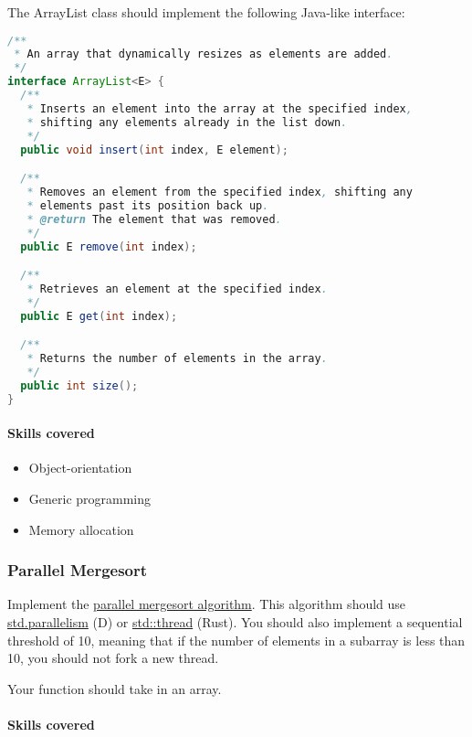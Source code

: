 The ArrayList class should implement the following Java-like interface:

\begin{lstlisting}[language=Java]
/**
 * An array that dynamically resizes as elements are added.
 */
interface ArrayList<E> {
  /**
   * Inserts an element into the array at the specified index,
   * shifting any elements already in the list down.
   */
  public void insert(int index, E element);

  /**
   * Removes an element from the specified index, shifting any
   * elements past its position back up.
   * @return The element that was removed.
   */
  public E remove(int index);

  /**
   * Retrieves an element at the specified index.
   */
  public E get(int index);

  /**
   * Returns the number of elements in the array.
   */
  public int size();
}
\end{lstlisting}

\paragraph{Skills covered}\label{skills-covered-2}

\begin{itemize}
\itemsep1pt\parskip0pt
\item
  Object-orientation
\item
  Generic programming
\item
  Memory allocation
\end{itemize}

\subsubsection{Parallel Mergesort}\label{parallel-mergesort}

Implement the
\href{http://en.wikipedia.org/wiki/Merge_sort\#Parallel_merge_sort}{parallel
mergesort algorithm}. This algorithm should use
\href{http://dlang.org/phobos/std_parallelism.html}{std.parallelism} (D)
or \href{http://doc.rust-lang.org/std/thread/}{std::thread} (Rust). You
should also implement a sequential threshold of 10, meaning that if the
number of elements in a subarray is less than 10, you should not fork a
new thread.

Your function should take in an array.

\paragraph{Skills covered}\label{skills-covered-3}

